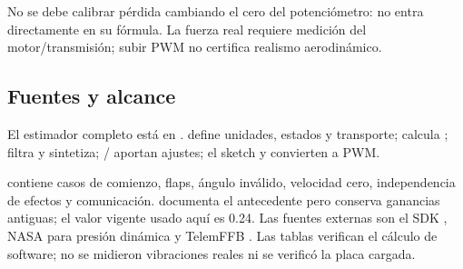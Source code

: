 No se debe calibrar pérdida cambiando el cero del potenciómetro: no entra directamente en su fórmula. La fuerza real requiere medición del motor/transmisión; subir PWM no certifica realismo aerodinámico.

\subsection{Fuentes y alcance}
El estimador completo está en .  define unidades, estados y transporte;  calcula ;  filtra y sintetiza; / aportan ajustes; el sketch y  convierten a PWM.

 contiene casos de comienzo, flaps, ángulo inválido, velocidad cero, independencia de efectos y comunicación.  documenta el antecedente pero conserva ganancias antiguas; el valor vigente usado aquí es 0.24. Las fuentes externas son el SDK \cite{p3dv3}, NASA para presión dinámica \cite{nasaq} y TelemFFB \cite{telemffb}. Las tablas verifican el cálculo de software; no se midieron vibraciones reales ni se verificó la placa cargada.
\newpage
